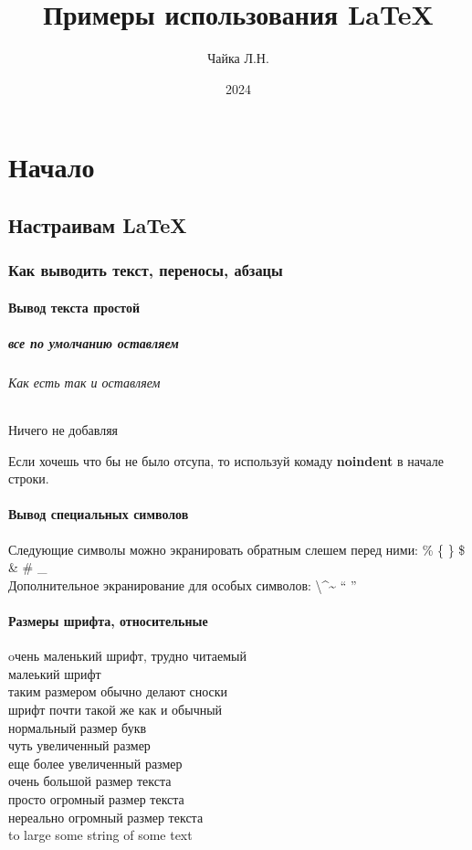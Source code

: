 \documentclass[oneside,final,14pt]{extreport}
\title{Примеры использования LaTeX}
\author{Чайка Л.Н.}
\date{2024}
\begin{document}
\maketitle %

\part{Начало}
\chapter{Настраивам LaTeX}
\section{Как выводить текст, переносы, абзацы}
\subsection{Вывод текста простой}
\subsubsection{все по умолчанию оставляем}
\paragraph{Как есть так и оставляем}
\subparagraph{Ничего не добавляя}
Если хочешь что бы не было отсупа, то используй комаду
\textbf{noindent} в начале строки.\newline
\subsection{Вывод специальных символов}
Следующие символы можно экранировать обратным слешем
перед ними: \% \{ \} \$ \& \# \_ \\
Дополнительное экранирование для особых
символов: \textbackslash  \textasciicircum \~{}  `` '' \\

\subsection{Размеры шрифта, относительные}
\tiny oчень маленький шрифт, трудно читаемый \\
\scriptsize малеький шрифт \\
\footnotesize таким размером обычно делают сноски \\
\small шрифт почти такой же как и обычный \\
\normalsize нормальный размер букв \\
\large чуть увеличенный размер \\
\Large еще более увеличенный размер \\
\LARGE очень большой размер текста \\
\huge просто огромный размер текста \\
\Huge нереально огромный размер текста \\
\Huge to large some string of some text \\
\normalsize
\end{document}

